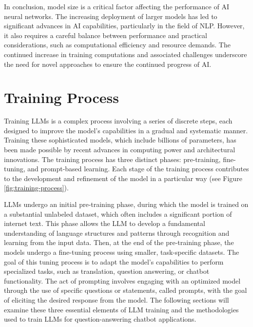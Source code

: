 In conclusion, model size is a critical factor affecting the performance of AI neural networks. The increasing deployment of larger models has led to significant advances in AI capabilities, particularly in the field of NLP. However, it also requires a careful balance between performance and practical considerations, such as computational efficiency and resource demands. The continued increase in training computations and associated challenges underscore the need for novel approaches to ensure the continued progress of AI.

\section{Training Process}

Training LLMs is a complex process involving a series of discrete steps, each designed to improve the model's capabilities in a gradual and systematic manner. Training these sophisticated models, which include billions of parameters, has been made possible by recent advances in computing power and architectural innovations. The training process has three distinct phases: pre-training, fine-tuning, and prompt-based learning. Each stage of the training process contributes to the development and refinement of the model in a particular way (see Figure \ref{fig:training-process}).

LLMs undergo an initial pre-training phase, during which the model is trained on a substantial unlabeled dataset, which often includes a significant portion of internet text. This phase allows the LLM to develop a fundamental understanding of language structures and patterns through recognition and learning from the input data. Then, at the end of the pre-training phase, the models undergo a fine-tuning process using smaller, task-specific datasets. The goal of this tuning process is to adapt the model's capabilities to perform specialized tasks, such as translation, question answering, or chatbot functionality. The act of prompting involves engaging with an optimized model through the use of specific questions or statements, called prompts, with the goal of eliciting the desired response from the model. The following sections will examine these three essential elements of LLM training and the methodologies used to train LLMs for question-answering chatbot applications.

